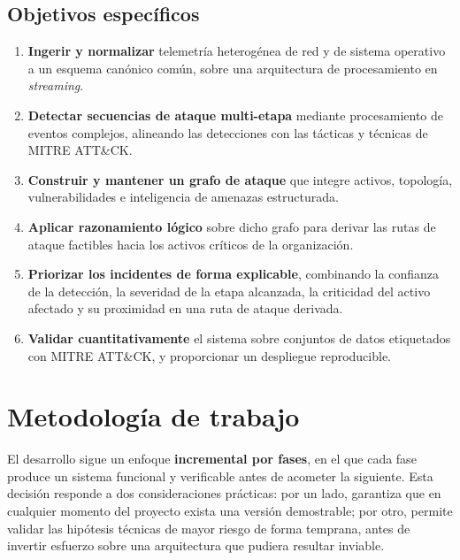 \subsection{Objetivos específicos}

\begin{enumerate}
    \item \textbf{Ingerir y normalizar} telemetría heterogénea de red y de sistema operativo
    a un esquema canónico común, sobre una arquitectura de procesamiento en
    \textit{streaming}.

    \item \textbf{Detectar secuencias de ataque multi-etapa} mediante procesamiento de
    eventos complejos, alineando las detecciones con las tácticas y técnicas de MITRE
    ATT\&CK.

    \item \textbf{Construir y mantener un grafo de ataque} que integre activos, topología,
    vulnerabilidades e inteligencia de amenazas estructurada.

    \item \textbf{Aplicar razonamiento lógico} sobre dicho grafo para derivar las rutas de
    ataque factibles hacia los activos críticos de la organización.

    \item \textbf{Priorizar los incidentes de forma explicable}, combinando la confianza de
    la detección, la severidad de la etapa alcanzada, la criticidad del activo afectado y su
    proximidad en una ruta de ataque derivada.

    \item \textbf{Validar cuantitativamente} el sistema sobre conjuntos de datos etiquetados
    con MITRE ATT\&CK, y proporcionar un despliegue reproducible.
\end{enumerate}

\section{Metodología de trabajo}

El desarrollo sigue un enfoque \textbf{incremental por fases}, en el que cada fase produce
un sistema funcional y verificable antes de acometer la siguiente. Esta decisión responde a
dos consideraciones prácticas: por un lado, garantiza que en cualquier momento del proyecto
exista una versión demostrable; por otro, permite validar las hipótesis técnicas de mayor
riesgo de forma temprana, antes de invertir esfuerzo sobre una arquitectura que pudiera
resultar inviable.

